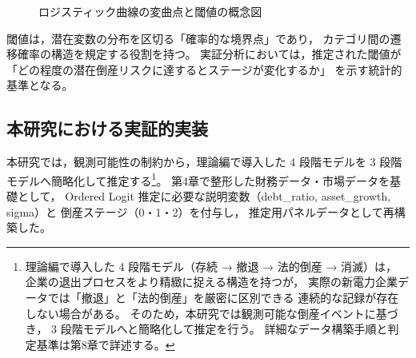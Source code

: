 \begin{figure}[H]
\centering
{}
\caption{ロジスティック曲線の変曲点と閾値の概念図}
\label{fig:cutpoint_logistic}
\end{figure}

閾値は，潜在変数の分布を区切る「確率的な境界点」であり，
カテゴリ間の遷移確率の構造を規定する役割を持つ。
実証分析においては，推定された閾値が
「どの程度の潜在倒産リスクに達するとステージが変化するか」
を示す統計的基準となる。


\subsection{本研究における実証的実装}

本研究では，観測可能性の制約から，理論編で導入した 4 段階モデルを 3 段階モデルへ簡略化して推定する\footnote{
理論編で導入した 4 段階モデル（存続 → 撤退 → 法的倒産 → 消滅）は，
企業の退出プロセスをより精緻に捉える構造を持つが，
実際の新電力企業データでは「撤退」と「法的倒産」を厳密に区別できる
連続的な記録が存在しない場合がある。
そのため，本研究では観測可能な倒産イベントに基づき，
3 段階モデルへと簡略化して推定を行う。
詳細なデータ構築手順と判定基準は第8章で詳述する。
}。
第4章で整形した財務データ・市場データを基礎として，
Ordered Logit 推定に必要な説明変数（debt\_ratio, asset\_growth, sigma）と
倒産ステージ（0・1・2）を付与し，
推定用パネルデータとして再構築した。

